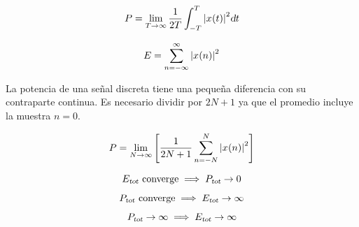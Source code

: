 \begin{mdframed}[style=DefinitionFrame]
    \begin{defn}
    \end{defn}
    \begin{equation*}
        P = \lim_{T \to \infty} \frac{1}{2T} \int_{-T}^{T} \norm{\fx[x]{t}}^2 \dif t
    \end{equation*}
\end{mdframed}

\begin{mdframed}[style=DefinitionFrame]
    \begin{defn}
    \end{defn}
    \begin{equation*}
        E = \sum_{n=-\infty}^{\infty} \norm{\fx[x]{n}}^2
    \end{equation*}
\end{mdframed}

La potencia de una señal discreta tiene una pequeña diferencia con su contraparte continua.
Es necesario dividir por $2N+1$ ya que el promedio incluye la muestra $n=0$.

\begin{mdframed}[style=DefinitionFrame]
    \begin{defn}
    \end{defn}
    \begin{equation*}
        P = \lim_{N \to \infty} \inBrackets{\displaystyle \frac{1}{2N+1} \displaystyle \sum_{n=-N}^{N} \norm{\fx[x]{n}}^2}
    \end{equation*}
\end{mdframed}

\begin{mdframed}[style=PropertyFrame]
    \begin{prop}
    \end{prop}
    \begin{equation*}
        \sub{E}{tot} \text{ converge} \implies \sub{P}{tot} \to 0
    \end{equation*}
\end{mdframed}

\begin{mdframed}[style=PropertyFrame]
    \begin{prop}
    \end{prop}
    \begin{equation*}
        \sub{P}{tot} \text{ converge} \implies \sub{E}{tot} \to \infty
    \end{equation*}
\end{mdframed}

\begin{mdframed}[style=PropertyFrame]
    \begin{prop}
    \end{prop}
    \begin{equation*}
        \sub{P}{tot} \to \infty \implies \sub{E}{tot} \to \infty
    \end{equation*}
\end{mdframed}